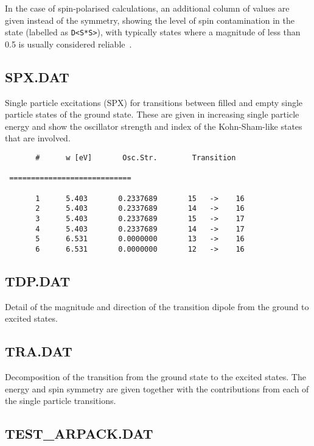 In the case of spin-polarised calculations, an additional column of values are
given instead of the symmetry, showing the level of spin contamination in the
state (labelled as \verb|D<S*S>|), with typically states where a magnitude of
less than 0.5 is usually considered reliable~\cite{garcia14Thesis}.

\subsection{SPX.DAT}

Single particle excitations (SPX) for transitions between filled and empty single
particle states of the ground state. These are given in increasing single
particle energy and show the oscillator strength and index of the Kohn-Sham-like
states that are involved.

\begin{verbatim}
       #      w [eV]       Osc.Str.        Transition

 ============================

       1      5.403       0.2337689       15   ->    16
       2      5.403       0.2337689       14   ->    16
       3      5.403       0.2337689       15   ->    17
       4      5.403       0.2337689       14   ->    17
       5      6.531       0.0000000       13   ->    16
       6      6.531       0.0000000       12   ->    16
\end{verbatim}

\subsection{TDP.DAT}

Detail of the magnitude and direction of the transition dipole from the ground
to excited states.

\subsection{TRA.DAT}

Decomposition of the transition from the ground state to the excited states. The
energy and spin symmetry are given together with the contributions from each of
the single particle transitions.

\subsection{TEST\_ARPACK.DAT}

